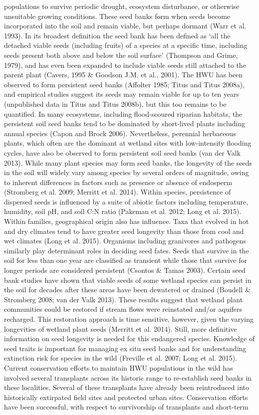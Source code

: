 \documentclass[twocolumn]{article}
\begin{document}
populations to survive periodic drought, ecosystem disturbance, or otherwise unsuitable growing conditions. These seed banks form when seeds become incorporated into the soil and remain viable, but perhaps dormant (Warr et al. 1993). In its broadest definition the seed bank has been defined as ‘all the detached viable seeds (including fruits) of a species at a specific time, including seeds present both above and below the soil surface’ (Thompson and Grime, 1979), and has even been expanded to include viable seeds still attached to the parent plant (Cavers, 1995 & Goodson J.M. et al., 2001). The HWU has been observed to form persistent seed banks (Affolter 1985; Titus and Titus 2008a), and empirical studies suggest its seeds may remain viable for up to ten years (unpublished data in Titus and Titus 2008b), but this too remains to be quantified. In many ecosystems, including flood-scoured riparian habitats, the persistent soil seed banks tend to be dominated by short-lived plants including annual species (Capon and Brock 2006). Nevertheless, perennial herbaceous plants, which often are the dominant at wetland sites with low-intensity flooding cycles, have also be observed to form persistent soil seed banks (van der Valk 2013). While many plant species may form seed banks, the longevity of the seeds in the soil will widely vary among species by several orders of magnitude, owing to inherent differences in factors such as presence or absence of endosperm (Stromberg et al. 2009; Merritt et al. 2014). Within species, persistence of dispersed seeds is influenced by a suite of abiotic factors including temperature, humidity, soil pH, and soil C:N ratio (Pakeman et al. 2012; Long et al. 2015). Within families, geographical origin also has influence. Taxa that evolved in hot and dry climates tend to have greater seed longevity than those from cool and wet climates (Long et al. 2015). Organisms including granivores and pathogens similarly play determinant roles in deciding seed fates. Seeds that survive in the soil for less than one year are classified as transient while those that survive for longer periods are considered persistent (Csontos & Tamas 2003). Certain seed bank studies have shown that viable seeds of some wetland species can persist in the soil for decades after these areas have been dewatered or drained (Boudell & Stromberg 2008; van der Valk 2013). These results suggest that wetland plant communities could be restored if stream flows were reinstated and/or aquifers recharged. This restoration approach is time sensitive, however, given the varying longevities of wetland plant seeds (Merritt et al. 2014). Still, more definitive information on seed longevity is needed for this endangered species. Knowledge of seed traits is important for managing ex situ seed banks and for understanding extinction risk for species in the wild (Freville et al. 2007; Long et al. 2015). Current conservation efforts to maintain HWU populations in the wild has involved several transplants across its historic range to re-establish seed banks in these localities. Several of these transplants have already been reintroduced into historically extirpated field sites and protected urban sites. Conservation efforts have been successful, with respect to survivorship of transplants and short-term 
\end{document}
